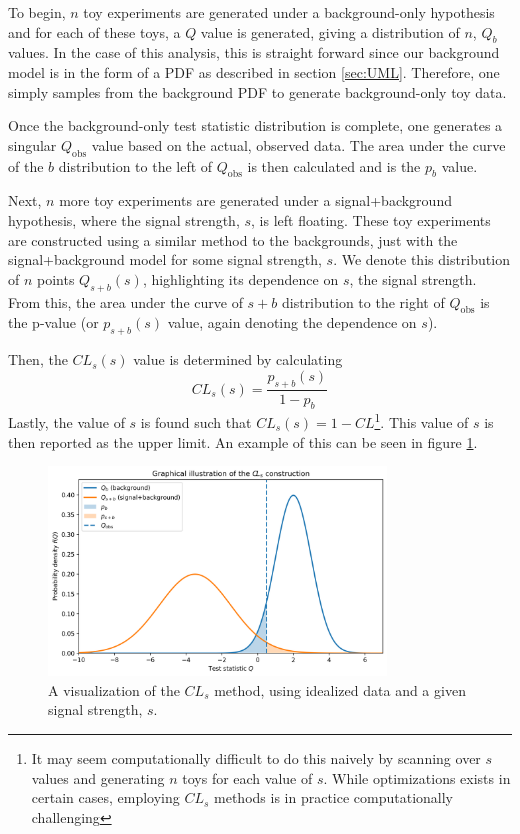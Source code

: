 To begin, $n$ toy experiments are generated under a background-only hypothesis and for each of these toys, a $Q$ value is generated, giving a distribution of $n$, $Q_b$ values. In the case of this analysis, this is straight forward since our background model is in the form of a PDF as described in section \ref{sec:UML}. Therefore, one simply samples from the background PDF to generate background-only toy data. 

Once the background-only test statistic distribution is complete, one generates a singular $Q_{\text{obs}}$ value based on the actual, observed data. The area under the curve of the $b$ distribution to the left of $Q_{\text{obs}}$ is then calculated and is the $p_b$ value.

Next, $n$ more toy experiments are generated under a signal+background hypothesis, where the signal strength, $s$, is left floating. These toy experiments are constructed using a similar method to the backgrounds, just with the signal+background model for some signal strength, $s$. We denote this distribution of $n$ points $Q_{s+b}(s)$, highlighting its dependence on $s$, the signal strength. From this, the area under the curve of $s+b$ distribution to the right of $Q_{\text{obs}}$ is the p-value (or $p_{s+b}(s)$ value, again denoting the dependence on $s$). 

Then, the $CL_s(s)$ value is determined by calculating
\begin{equation}
    CL_s(s) = \frac{p_{s+b}(s)}{1-p_b}
\label{eq:cls}
\end{equation}
Lastly, the value of $s$ is found such that $CL_s(s) = 1-CL$\footnote{It may seem computationally difficult to do this naively by scanning over $s$ values and generating $n$ toys for each value of $s$. While optimizations exists in certain cases, employing $CL_s$ methods is in practice computationally challenging}. This value of $s$ is then reported as the upper limit. An example of this can be seen in figure \ref{fig:cls_visualization}.

\begin{figure}[h!]
    \begin{center}
      \includegraphics[width=0.8\textwidth]{figures/chapter4/cls_visualization.png}
    \end{center}
    \caption{
      A visualization of the $CL_s$ method, using idealized data and a given signal strength, $s$. 
    }
    \label{fig:cls_visualization}
\end{figure}


